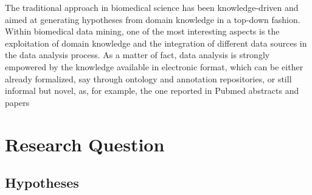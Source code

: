 \documentclass[10pt,a4paper]{article}
\begin{document}
	The traditional approach in biomedical science has been knowledge-driven and aimed at generating hypotheses from domain knowledge in a top-down fashion. Within biomedical data mining, one of the most
	interesting aspects is the exploitation of domain knowledge and the integration of different data sources in the data analysis process. As a matter of fact, data analysis is strongly empowered by the knowledge available in electronic format, which can be either already formalized, say through ontology and annotation repositories, or still informal but novel, as, for example, the one reported in Pubmed abstracts and papers\cite{bellazzi2011data}
	
	\section{Research Question}
	
	\subsection{Hypotheses}
	
	 
	
	
\end{document}
